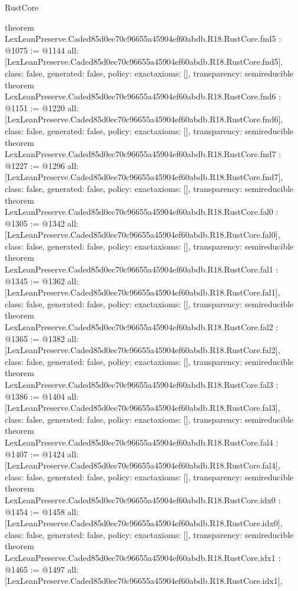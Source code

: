\begin{lexlean}{RustCore}
\begin{coremodule}
{}
theorem LexLeanPreserve.Caded85d0ec70c96655a45904ef60abdb.R18.RustCore.fnd5 : @1075 := @1144 {
  all: [LexLeanPreserve.Caded85d0ec70c96655a45904ef60abdb.R18.RustCore.fnd5],
  class: false,
  generated: false,
  policy: exact{axioms: []},
  transparency: semireducible
}
theorem LexLeanPreserve.Caded85d0ec70c96655a45904ef60abdb.R18.RustCore.fnd6 : @1151 := @1220 {
  all: [LexLeanPreserve.Caded85d0ec70c96655a45904ef60abdb.R18.RustCore.fnd6],
  class: false,
  generated: false,
  policy: exact{axioms: []},
  transparency: semireducible
}
theorem LexLeanPreserve.Caded85d0ec70c96655a45904ef60abdb.R18.RustCore.fnd7 : @1227 := @1296 {
  all: [LexLeanPreserve.Caded85d0ec70c96655a45904ef60abdb.R18.RustCore.fnd7],
  class: false,
  generated: false,
  policy: exact{axioms: []},
  transparency: semireducible
}
theorem LexLeanPreserve.Caded85d0ec70c96655a45904ef60abdb.R18.RustCore.fal0 : @1305 := @1342 {
  all: [LexLeanPreserve.Caded85d0ec70c96655a45904ef60abdb.R18.RustCore.fal0],
  class: false,
  generated: false,
  policy: exact{axioms: []},
  transparency: semireducible
}
theorem LexLeanPreserve.Caded85d0ec70c96655a45904ef60abdb.R18.RustCore.fal1 : @1345 := @1362 {
  all: [LexLeanPreserve.Caded85d0ec70c96655a45904ef60abdb.R18.RustCore.fal1],
  class: false,
  generated: false,
  policy: exact{axioms: []},
  transparency: semireducible
}
theorem LexLeanPreserve.Caded85d0ec70c96655a45904ef60abdb.R18.RustCore.fal2 : @1365 := @1382 {
  all: [LexLeanPreserve.Caded85d0ec70c96655a45904ef60abdb.R18.RustCore.fal2],
  class: false,
  generated: false,
  policy: exact{axioms: []},
  transparency: semireducible
}
theorem LexLeanPreserve.Caded85d0ec70c96655a45904ef60abdb.R18.RustCore.fal3 : @1386 := @1404 {
  all: [LexLeanPreserve.Caded85d0ec70c96655a45904ef60abdb.R18.RustCore.fal3],
  class: false,
  generated: false,
  policy: exact{axioms: []},
  transparency: semireducible
}
theorem LexLeanPreserve.Caded85d0ec70c96655a45904ef60abdb.R18.RustCore.fal4 : @1407 := @1424 {
  all: [LexLeanPreserve.Caded85d0ec70c96655a45904ef60abdb.R18.RustCore.fal4],
  class: false,
  generated: false,
  policy: exact{axioms: []},
  transparency: semireducible
}
theorem LexLeanPreserve.Caded85d0ec70c96655a45904ef60abdb.R18.RustCore.idx0 : @1454 := @1458 {
  all: [LexLeanPreserve.Caded85d0ec70c96655a45904ef60abdb.R18.RustCore.idx0],
  class: false,
  generated: false,
  policy: exact{axioms: []},
  transparency: semireducible
}
theorem LexLeanPreserve.Caded85d0ec70c96655a45904ef60abdb.R18.RustCore.idx1 : @1465 := @1497 {
  all: [LexLeanPreserve.Caded85d0ec70c96655a45904ef60abdb.R18.RustCore.idx1],
}
\end{coremodule}
\end{lexlean}
